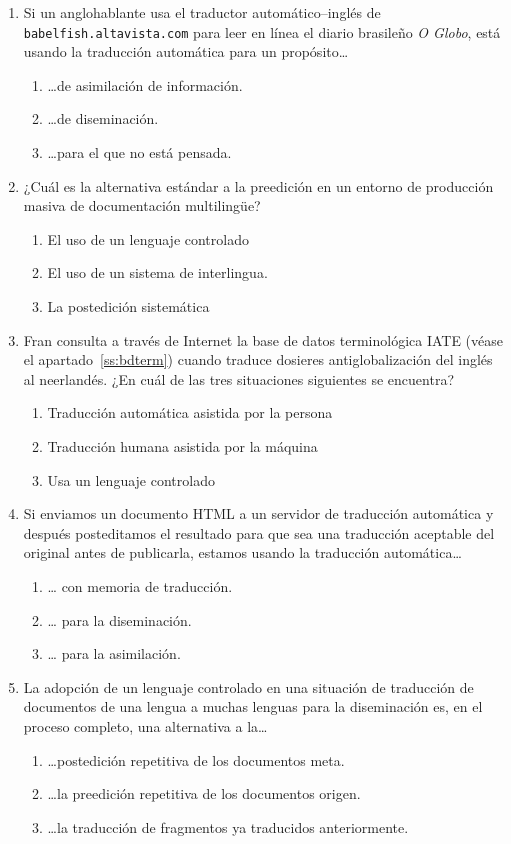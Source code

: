 \begin{enumerate}
\item Si un anglohablante usa el traductor automático--inglés de \verb|babelfish.altavista.com| para leer en línea el diario brasileño \emph{O Globo}, está usando la traducción automática para un propósito\ldots \begin{enumerate} \item \ldots de asimilación de información. \item \ldots de diseminación. \item \ldots para el que no está pensada. \end{enumerate} 

\item ¿Cuál es la alternativa estándar a la preedición en un entorno de producción masiva de documentación multilingüe? \begin{enumerate} \item El uso de un lenguaje controlado \item El uso de un sistema de interlingua. \item La postedición sistemática \end{enumerate} 

\item Fran consulta a través de Internet la base de datos terminológica IATE (véase el apartado~\ref{ss:bdterm}) cuando traduce dosieres antiglobalización del inglés al neerlandés. ¿En cuál de las tres situaciones siguientes se encuentra? \begin{enumerate} \item Traducción automática asistida por la persona \item Traducción humana asistida por la máquina \item Usa un lenguaje controlado \end{enumerate} 

\item Si enviamos un documento HTML a un servidor de traducción automática y después posteditamos el resultado para que sea una traducción aceptable del original antes de publicarla, estamos usando la traducción automática{\ldots} \begin{enumerate} \item {\ldots} con memoria de traducción. \item {\ldots} para la diseminación. \item {\ldots} para la asimilación. \end{enumerate} 

\item La adopción de un lenguaje controlado en una situación de traducción de documentos de una lengua a muchas lenguas para la diseminación es, en el proceso completo, una alternativa a la{\ldots} \begin{enumerate} \item {\ldots}postedición repetitiva de los documentos meta. \item {\ldots}la preedición repetitiva de los documentos origen. \item {\ldots}la traducción de fragmentos ya traducidos anteriormente. \end{enumerate} 


\end{enumerate}
